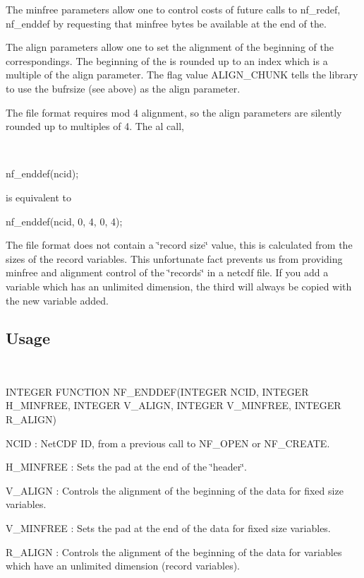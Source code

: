 The minfree parameters allow one to control costs of future calls to nf\+\_\+redef, nf\+\_\+enddef by requesting that minfree bytes be available at the end of the.

The align parameters allow one to set the alignment of the beginning of the correspondings. The beginning of the is rounded up to an index which is a multiple of the align parameter. The flag value A\+L\+I\+G\+N\+\_\+\+C\+H\+U\+NK tells the library to use the bufrsize (see above) as the align parameter.

The file format requires mod 4 alignment, so the align parameters are silently rounded up to multiples of 4. The al call,

 

nf\+\_\+enddef(ncid);

is equivalent to

nf\+\_\+enddef(ncid, 0, 4, 0, 4);

The file format does not contain a \char`\"{}record size\char`\"{} value, this is calculated from the sizes of the record variables. This unfortunate fact prevents us from providing minfree and alignment control of the \char`\"{}records\char`\"{} in a netcdf file. If you add a variable which has an unlimited dimension, the third will always be copied with the new variable added.

\subsection*{Usage }

 

I\+N\+T\+E\+G\+ER F\+U\+N\+C\+T\+I\+ON N\+F\+\_\+\+E\+N\+D\+D\+EF(I\+N\+T\+E\+G\+ER N\+C\+ID, I\+N\+T\+E\+G\+ER H\+\_\+\+M\+I\+N\+F\+R\+EE, I\+N\+T\+E\+G\+ER V\+\_\+\+A\+L\+I\+GN, I\+N\+T\+E\+G\+ER V\+\_\+\+M\+I\+N\+F\+R\+EE, I\+N\+T\+E\+G\+ER R\+\_\+\+A\+L\+I\+GN)

{\ttfamily N\+C\+ID} \+: Net\+C\+DF ID, from a previous call to N\+F\+\_\+\+O\+P\+EN or N\+F\+\_\+\+C\+R\+E\+A\+TE.

{\ttfamily H\+\_\+\+M\+I\+N\+F\+R\+EE} \+: Sets the pad at the end of the \char`\"{}header\char`\"{}.

{\ttfamily V\+\_\+\+A\+L\+I\+GN} \+: Controls the alignment of the beginning of the data for fixed size variables.

{\ttfamily V\+\_\+\+M\+I\+N\+F\+R\+EE} \+: Sets the pad at the end of the data for fixed size variables.

{\ttfamily R\+\_\+\+A\+L\+I\+GN} \+: Controls the alignment of the beginning of the data for variables which have an unlimited dimension (record variables).

